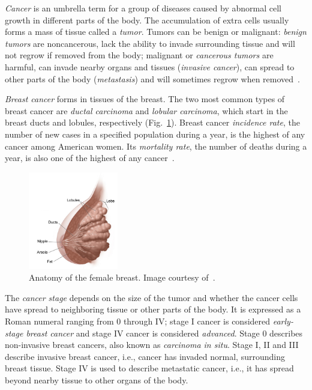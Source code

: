 \emph{Cancer} is an umbrella term for a group of diseases caused by abnormal cell growth in different parts of the body. The accumulation of extra cells usually forms a mass of tissue called a \emph{tumor}. Tumors can be benign or malignant: \emph{benign tumors} are noncancerous, lack the ability to invade surrounding tissue and will not regrow if removed from the body;  malignant or \emph{cancerous tumors} are harmful, can invade nearby organs and tissues (\emph{invasive cancer}), can spread to other parts of the body (\emph{metastasis}) and will sometimes regrow when removed~\cite{NCI2012}.

\emph{Breast cancer} forms in tissues of the breast. The two most common types of breast cancer are \emph{ductal carcinoma} and \emph{lobular carcinoma}, which start in the breast ducts and lobules, respectively (Fig.~\ref{fig:BreastAnatomy}). Breast cancer \emph{incidence rate}, the number of new cases in a specified population during a year, is the highest of any cancer among American women. Its \emph{mortality rate}, the number of deaths during a year, is also one of the highest of any cancer~\cite{Howlader2014}.

\begin{figure}[h]
	\centering
	\includegraphics[width = 0.35\textwidth]{plots/breastAnatomy.png}
	\caption[Anatomy of the female breast]{Anatomy of the female breast. Image courtesy of~\cite{NCI2012}.}
	\label{fig:BreastAnatomy}
\end{figure}

The \emph{cancer stage} depends on the size of the tumor and whether the cancer cells have spread to neighboring tissue or other parts of the body. It is expressed as a Roman numeral ranging from 0 through IV; stage I cancer is considered \emph{early-stage breast cancer} and stage IV cancer is considered \emph{advanced}. Stage 0 describes non-invasive breast cancers, also known as \emph{carcinoma in situ}. Stage I, II and III describe invasive breast cancer, i.e., cancer has invaded normal, surrounding breast tissue. Stage IV is used to describe metastatic cancer, i.e., it has spread beyond nearby tissue to other organs of the body.

